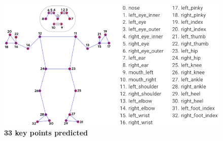 \begin{figure}[h]
    \begin{center}
        \includegraphics[width=1.0\linewidth]{fig/medpose.png}
    \end{center}
    \caption{\textbf{33 key points predicted}
    }
    \label{fig:medpose}
\end{figure}